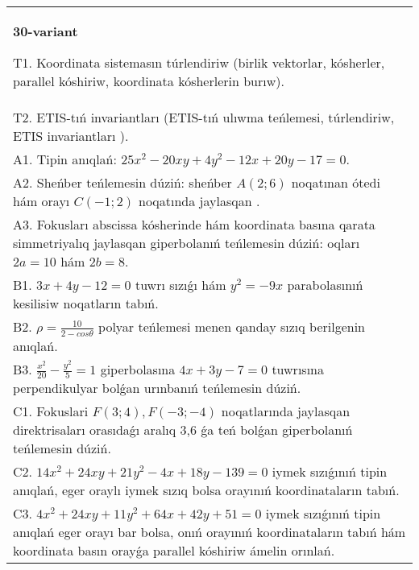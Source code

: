 \documentclass{article}
\begin{document}
\begin{tabular}{m{17cm}}
\textbf{30-variant}
\newline

T1. Koordinata sistemasın túrlendiriw (birlik vektorlar, kósherler, parallel kóshiriw, koordinata kósherlerin burıw).\\

T2. ETIS-tıń invariantları (ETIS-tıń ulıwma teńlemesi, túrlendiriw, ETIS invariantları ).\\

A1. Tipin anıqlań: $25 x^{2}-20 xy+4 y^{2}-12 x+20 y-17=0$.\\

A2. Sheńber teńlemesin dúziń: sheńber $A (2;6 ) $ noqatınan ótedi hám orayı $C (-1;2) $ noqatında jaylasqan .\\

A3. Fokusları abscissa kósherinde hám koordinata basına qarata simmetriyalıq jaylasqan giperbolanıń teńlemesin dúziń: oqları $2 a=10$ hám $2 b=8$.\\

B1. $3x + 4y - 12 = 0$ tuwrı sızıǵı hám $y^{2} = - 9x$ parabolasınıń kesilisiw noqatların tabıń.  \\

B2. $\rho = \frac{10}{2 - cos\theta}$ polyar teńlemesi menen qanday sızıq berilgenin anıqlań.  \\

B3. $\frac{x^{2}}{20} - \frac{y^{2}}{5} = 1$ giperbolasına $4x + 3y - 7 = 0$ tuwrısına perpendikulyar bolǵan urınbanıń teńlemesin dúziń.  \\

C1. Fokuslari $F(3;4), F(-3;-4)$ noqatlarında jaylasqan direktrisaları orasıdaǵı aralıq 3,6 ǵa teń bolǵan giperbolanıń teńlemesin dúziń.  \\

C2. $14x^{2} + 24xy + 21y^{2} - 4x + 18y - 139 = 0$ iymek sızıǵınıń tipin anıqlań, eger oraylı iymek sızıq bolsa orayınıń koordinataların tabıń.  \\

C3. $4x^{2} + 24xy + 11y^{2} + 64x + 42y + 51 = 0$ iymek sızıǵınıń tipin anıqlań eger orayı bar bolsa, onıń orayınıń koordinataların tabıń hám koordinata basın orayǵa parallel kóshiriw ámelin orınlań.  \\

\end{tabular}
\vspace{1cm}
\end{document}
